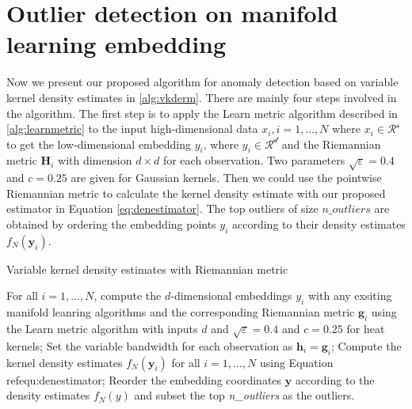 \documentclass[11pt,a4paper,]{article}
\begin{document}
\hypertarget{outlier-detection-on-manifold-learning-embedding}{%
\section{Outlier detection on manifold learning embedding}\label{outlier-detection-on-manifold-learning-embedding}}

Now we present our proposed algorithm for anomaly detection based on variable kernel density estimates in \ref{alg:vkderm}. There are mainly four steps involved in the algorithm. The first step is to apply the Learn metric algorithm described in \ref{alg:learnmetric} to the input high-dimensional data \(x_i,i=1,\ldots,N\) where \(x_i\in \mathcal{R^s}\) to get the low-dimensional embedding \(y_i\), where \(y_i\in \mathcal{R^d}\) and the Riemannian metric \(\pmb{H}_i\) with dimension \(d\times d\) for each observation. Two parameters \(\sqrt{\varepsilon} = 0.4\) and \(c=0.25\) are given for Gaussian kernels. Then we could use the pointwise Riemannian metric to calculate the kernel density estimate with our proposed estimator in Equation \eqref{eq:denestimator}. The top outliers of size \(n\_outliers\) are obtained by ordering the embedding points \(y_i\) according to their density estimates \(f_N(\pmb{y}_i)\).

\begin{algorithm}[!htb]
  \caption{Variable kernel density estimates with Riemannian metric}
  \label{alg:vkderm}
  \DontPrintSemicolon
  \SetAlgoLined
  \BlankLine
  \begin{algorithmic}[1]

  \STATE For all $i=1,\ldots,N$, compute the $d$-dimensional embeddings $y_i$ with any exsiting manifold leanring algorithms and the corresponding Riemannian metric $\pmb{g}_i$ using the Learn metric algorithm with inputs $d$ and $\sqrt{\varepsilon} = 0.4$ and $c=0.25$ for heat kernels;
  \STATE Set the variable bandwidth for each observation as $\pmb{h}_i = \pmb{g}_i$;
  \STATE Compute the kernel density estimates $f_N(\pmb{y}_i)$ for all $i=1,\ldots,N$ using Equation \\ref{equ:denestimator};
  \STATE Reorder the embedding coordinates $\pmb{y}$ according to the density estimates $f_N(y)$ and subset the top \textit{n\_outliers} as the outliers.
  \end{algorithmic}
\end{algorithm}
\end{document}
